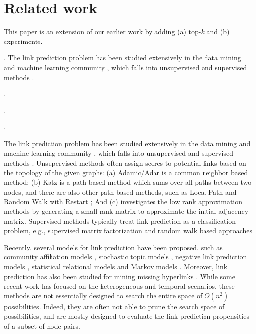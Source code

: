 \section{Related work}
\label{sec-related}

This paper is an extension of our earlier work \cite{liang2016} by adding (a) top-$k$ and (b) experiments.

. The link prediction problem has been studied extensively in the data 
mining and machine learning community \cite{kleinberg,linyuan-2011}, which falls into unsupervised 
and supervised methods \cite{propflow}.

.

.

.





The link prediction problem has been studied extensively in the data mining and machine learning community
\cite{kleinberg,linyuan-2011}, which falls into unsupervised and supervised methods \cite{propflow}. Unsupervised methods
often assign scores to potential links based on the topology of the given graphs:
(a) Adamic/Adar \cite{adamic} is a common neighbor based method; (b) Katz \cite{katz-1953} is a
path based method which sums over all paths between two nodes, and there are also other path based
methods, such as Local Path and Random Walk with Restart \cite{linyuan-2011}; And (c)
\cite{kunegis,kleinberg} investigates the low rank approximation methods by generating a
small rank matrix to approximate the initial adjacency matrix. Supervised methods \cite{Link09,propflow,lichen3} typically treat link prediction as a classification problem, e.g., supervised matrix factorization and random walk based approaches \cite{menon,back}


Recently, several models for link prediction have been proposed,
such as  community affiliation models \cite{Yang09,yang-wsdm2013}, stochastic topic models \cite{barbieri2014},
negative link prediction models \cite{tang2015}, statistical relational models \cite{bilgic,Getoor01,Getoor02,Taskar03,yu}
and Markov models \cite{zhu}. Moreover, link prediction has also been studied for mining
missing hyperlinks \cite{adafre,west2015}.
While some recent work has focused on the heterogeneous \cite{qi,sun11,sun12,tang,yang} and temporal \cite{back,dwang} scenarios, these methods are not essentially
designed to search the entire space of $O(n^2)$ possibilities. Indeed, they are often not able to prune the search space of possibilities, and are mostly designed to evaluate the link prediction propensities of a subset of node pairs.



